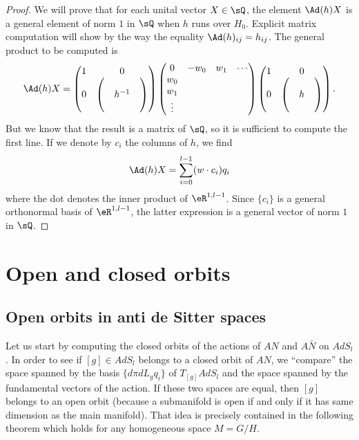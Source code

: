 \begin{proof}
We will prove that for each unital vector $X\in\sQ$, the element $\Ad(h)X$ is a general element of norm $1$ in $\sQ$ when $h$ runs over $H_0$. Explicit matrix computation will show by the way the equality  $\Ad(h)_{ij}=h_{ij}$. The general product to be computed is
\[
\Ad(h)X=
  \begin{pmatrix}
1	&	0\\
0	&
\begin{pmatrix}
&&\\
&h^{-1}\\
&&
\end{pmatrix}
\end{pmatrix}
\begin{pmatrix}
0&-w_0&w_1&\cdots\\
w_0\\
w_1\\
\vdots
\end{pmatrix}
  \begin{pmatrix}
1	&	0\\
0	&
\begin{pmatrix}
&&\\
&h\\
&&
\end{pmatrix}
\end{pmatrix}.
\]
But we know that the result is a matrix of $\sQ$, so it is sufficient to compute the first line. If we denote by $c_i$ the columns of $h$, we find
\[
  \Ad(h)X=\sum_{i=0}^{l-1}(w\cdot c_i)q_i
\]
where the dot denotes the inner product of $\eR^{1,l-1}$. Since $\{ c_i \}$ is a general orthonormal basis of $\eR^{1,l-1}$, the latter expression is a general vector of norm $1$ in $\sQ$.
\end{proof}

\section{Open and closed orbits}

\subsection{Open orbits in anti de Sitter spaces}

Let us start by computing the closed orbits of the actions of $AN$ and $A\bar{N}$ on $AdS_l$. In order to see if $[g]\in AdS_l$ belongs to a closed orbit of $AN$, we ``compare'' the space spanned by the basis $\{d\pi dL_g q_i\}$ of $T_{[g]}AdS_l$ and the space spanned by the fundamental vectors of the action. If these two spaces are equal, then $[g]$ belongs to an open orbit (because a submanifold is open if and only if it has same dimension as the main manifold). That idea is precisely contained in the following theorem which holds for any homogeneous space $M=G/H$.

